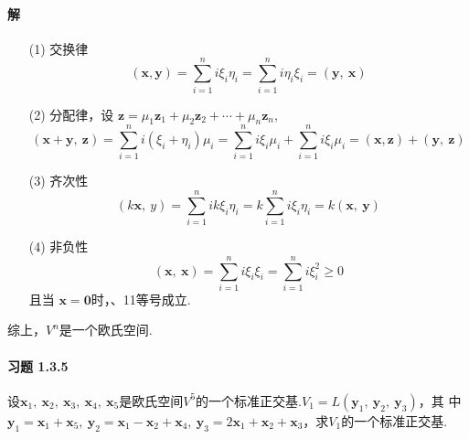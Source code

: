 \documentclass[12pt, a4paper, oneside, fontset=none]{ctexart}
\begin{document}
\paragraph*{解}
\begin{enumerate}
    \item[(1)] 交换律
        \[
            (\bm{x}, \bm{y}) = \sum_{i=1}^{n}i\xi_i\eta_i = \sum_{i=1}^{n}i\eta_i\xi_i = (\bm{y},\ \bm{x})
        \]
    \item[(2)] 分配律，设 $\bm{z} = \mu_1\bm{z}_1 + \mu_2\bm{z}_2 + \cdots + \mu_n\bm{z}_n,$
        \[
            (\bm{x} + \bm{y},\ \bm{z}) = \sum_{i=1}^{n}i(\xi_i + \eta_i)\mu_i = \sum_{i=1}^{n}i\xi_i\mu_i + \sum_{i=1}^{n}i\xi_i\mu_i = (\bm{x},\bm{z}) + (\bm{y},\ \bm{z})
        \]
    \item[(3)] 齐次性
        \[
            (k\bm{x},\ y) = \sum_{i=1}^{n}ik\xi_i\eta_i = k\sum_{i=1}^{n}i\xi_i\eta_i = k(\bm{x},\ \bm{y})
        \]
    \item[(4)] 非负性
        \[
            (\bm{x},\ \bm{x}) = \sum_{i=1}^{n}i\xi_i\xi_i = \sum_{i=1}^{n}i\xi_i^2 \geqslant 0
        \]
        且当 $\bm{x} = \bm{0}$时，、11等号成立.
\end{enumerate}
综上，$V^n$是一个欧氏空间.

\paragraph*{习题 1.3.5} 设$\bm{x}_1,\ \bm{x}_2,\ \bm{x}_3,\ \bm{x}_4,\ \bm{x}_5$是欧氏空间$V^5$的一个标准正交基.$V_1 = L(\bm{y}_1,\ \bm{y}_2,\ \bm{y}_3)$，其
中$\bm{y}_1 = \bm{x}_1 + \bm{x}_5,\ \bm{y}_2 = \bm{x}_1 - \bm{x}_2 + \bm{x}_4,\ \bm{y}_3 = 2\bm{x}_1 + \bm{x}_2 + \bm{x}_3$，求$V_1$的一个标准正交基.
\end{document}
